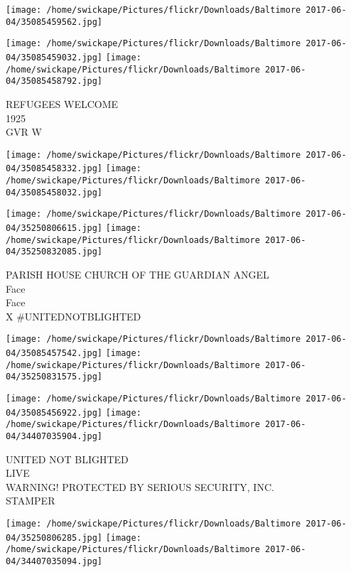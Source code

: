 \documentclass[10pt,letterpaper]{article}
\begin{document}
\texttt{[image: /home/swickape/Pictures/flickr/Downloads/Baltimore 2017-06-04/35085459562.jpg]}

\vspace{0.25in}
\texttt{[image: /home/swickape/Pictures/flickr/Downloads/Baltimore 2017-06-04/35085459032.jpg]}
\texttt{[image: /home/swickape/Pictures/flickr/Downloads/Baltimore 2017-06-04/35085458792.jpg]}

REFUGEES WELCOME\\
1925\\
GVR W\\
\pagebreak

\texttt{[image: /home/swickape/Pictures/flickr/Downloads/Baltimore 2017-06-04/35085458332.jpg]}
\texttt{[image: /home/swickape/Pictures/flickr/Downloads/Baltimore 2017-06-04/35085458032.jpg]}

\texttt{[image: /home/swickape/Pictures/flickr/Downloads/Baltimore 2017-06-04/35250806615.jpg]}
\texttt{[image: /home/swickape/Pictures/flickr/Downloads/Baltimore 2017-06-04/35250832085.jpg]}

PARISH HOUSE CHURCH OF THE GUARDIAN ANGEL\\
Face\\
Face\\
X \#UNITEDNOTBLIGHTED\\
\pagebreak

\texttt{[image: /home/swickape/Pictures/flickr/Downloads/Baltimore 2017-06-04/35085457542.jpg]}
\texttt{[image: /home/swickape/Pictures/flickr/Downloads/Baltimore 2017-06-04/35250831575.jpg]}

\texttt{[image: /home/swickape/Pictures/flickr/Downloads/Baltimore 2017-06-04/35085456922.jpg]}
\texttt{[image: /home/swickape/Pictures/flickr/Downloads/Baltimore 2017-06-04/34407035904.jpg]}

UNITED NOT BLIGHTED\\
LIVE\\
WARNING!  PROTECTED BY SERIOUS SECURITY, INC.\\
STAMPER\\
\pagebreak

\texttt{[image: /home/swickape/Pictures/flickr/Downloads/Baltimore 2017-06-04/35250806285.jpg]}
\texttt{[image: /home/swickape/Pictures/flickr/Downloads/Baltimore 2017-06-04/34407035094.jpg]}
\end{document}
